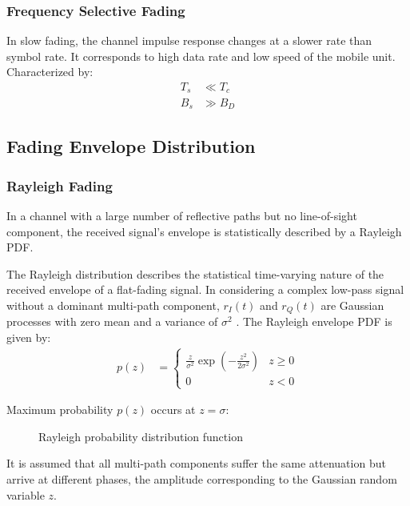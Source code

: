 \subsubsection{Frequency Selective Fading}
In slow fading, the channel impulse response changes at a slower rate than symbol rate. It corresponds to high data rate and low speed of the mobile unit. Characterized by:
\begin{align*}
	T_s &\ll T_c \\
	B_s &\gg B_D
\end{align*}

\subsection{Fading Envelope Distribution}
\subsubsection{Rayleigh Fading}
In a channel with a large number of reflective paths but no line-of-sight component, the received signal's envelope is statistically described by a Rayleigh \gls{PDF}\cite{AWGN}.

The Rayleigh distribution describes the statistical time-varying nature of the received envelope of a flat-fading signal\cite{4vn}. In considering a complex low-pass signal without a dominant multi-path component, \(r_I(t)\) and \(r_Q(t)\) are Gaussian processes with zero mean and a variance of \(\sigma^2\) \cite{fuqin}. The Rayleigh envelope \gls{PDF} is given by:
\begin{align*}
	p(z) &=
	\begin{cases}
		\frac{z}{\sigma^2} \exp \left( -\frac{z^2}{2\sigma^2} \right) & z \geq 0 \\
		0 & z < 0
	\end{cases}
\end{align*}
\begin{mathDef}
\end{mathDef}
Maximum probability \(p(z)\) occurs at \(z=\sigma\):
\begin{figure}[!ht]
	\centering
	\resizebox{0.8\textwidth}{!}{}
	\caption{Rayleigh probability distribution function}
\end{figure}
It is assumed that all multi-path components suffer the same attenuation but arrive at different phases, the amplitude corresponding to the Gaussian random variable \(z\)\cite{Hindu}.
